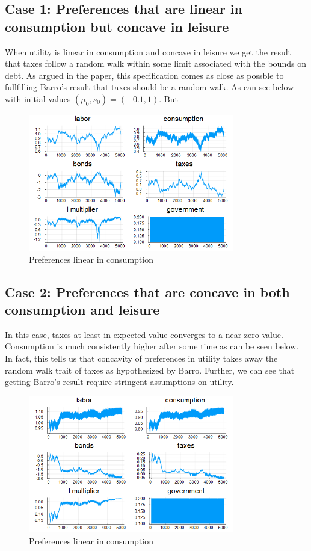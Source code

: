 \documentclass{article} %
\begin{document}
\subsection{Case 1: Preferences that are linear in consumption but concave in leisure}
When utility is linear in consumption and concave in leisure we get the result that taxes follow a random walk within some limit associated with the bounds on debt. As argued in the paper, this specification comes as close as possble to fullfilling Barro's result that taxes should be a random walk. As can see below with initial values $(\mu_0, s_0)= (-0.1,1)$. But

\begin{figure}
  \centering
  \includegraphics[width = 0.8\textwidth]{../debt_timeseries_linear.png}
    \caption{Preferences linear in consumption}
\end{figure}

\subsection{Case 2: Preferences that are concave in both consumption and leisure}
In this case, taxes at least in expected value converges to a near zero value. Consumption is much consistently higher after some time as can be seen below. In fact, this tells us that concavity of preferences in utility takes away the random walk trait of taxes as hypothesized by Barro. Further, we can see that getting Barro's result require stringent assumptions on utility. 

\begin{figure}
  \centering
  \includegraphics[width = 0.8\textwidth]{../debt_timeseries_concave.png}
    \caption{Preferences linear in consumption}
\end{figure}
% 
%
\end{document}
